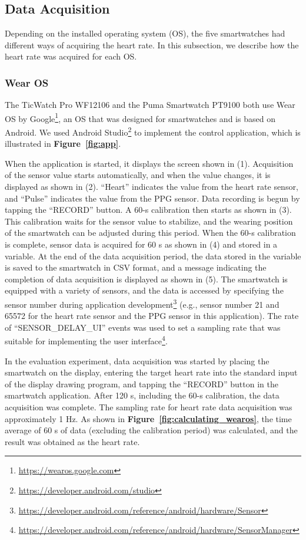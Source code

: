 \documentclass{ieeeaccess}
\newcommand\figref[1]{\textbf{Figure~\ref{fig:#1}}}
\begin{document}
\subsection{Data Acquisition}
Depending on the installed operating system (OS), the five smartwatches had different ways of acquiring the heart rate. In this subsection, we describe how the heart rate was acquired for each OS.

\subsubsection{Wear OS}
The TicWatch Pro WF12106 and the Puma Smartwatch PT9100 both use Wear OS by Google\footnote{\url{https://wearos.google.com}}, an OS that was designed for smartwatches and is based on Android. We used Android Studio\footnote{\url{https://developer.android.com/studio}} to implement the control application, which is illustrated in \figref{app}.\par

When the application is started, it displays the screen shown in (1). Acquisition of the sensor value starts automatically, and when the value changes, it is displayed as shown in (2). ``Heart'' indicates the value from the heart rate sensor, and ``Pulse'' indicates the value from the PPG sensor. Data recording is begun by tapping the ``RECORD'' button. A 60-s calibration then starts as shown in (3). This calibration waits for the sensor value to stabilize, and the wearing position of the smartwatch can be adjusted during this period. When the 60-s calibration is complete, sensor data is acquired for 60 s as shown in (4) and stored in a variable. At the end of the data acquisition period, the data stored in the variable is saved to the smartwatch in CSV format, and a message indicating the completion of data acquisition is displayed as shown in (5). The smartwatch is equipped with a variety of sensors, and the data is accessed by specifying the sensor number during application development\footnote{\url{https://developer.android.com/reference/android/hardware/Sensor}} (e.g., sensor number 21 and 65572 for the heart rate sensor and the PPG sensor in this application). The rate of ``SENSOR\_DELAY\_UI'' events was used to set a sampling rate that was suitable for implementing the user interface\footnote{\url{https://developer.android.com/reference/android/hardware/SensorManager}}.\par

In the evaluation experiment, data acquisition was started by placing the smartwatch on the display, entering the target heart rate into the standard input of the display drawing program, and tapping the ``RECORD'' button in the smartwatch application. After 120 s, including the 60-s calibration, the data acquisition was complete. The sampling rate for heart rate data acquisition was approximately 1 Hz. As shown in \figref{calculating_wearos}, the time average of 60 s of data (excluding the calibration period) was calculated, and the result was obtained as the heart rate.
\end{document}
